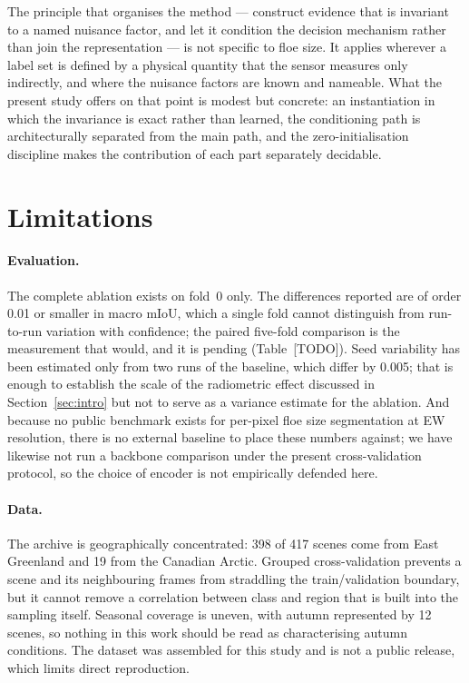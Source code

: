 \documentclass[preprint,12pt,authoryear]{elsarticle}
\begin{document}
The principle that organises the method --- construct evidence that is invariant
to a named nuisance factor, and let it condition the decision mechanism rather
than join the representation --- is not specific to floe size. It applies
wherever a label set is defined by a physical quantity that the sensor measures
only indirectly, and where the nuisance factors are known and nameable. What the
present study offers on that point is modest but concrete: an instantiation in
which the invariance is exact rather than learned, the conditioning path is
architecturally separated from the main path, and the zero-initialisation
discipline makes the contribution of each part separately decidable.

\section{Limitations}
\label{sec:limitations}

\paragraph{Evaluation.} The complete ablation exists on fold~0 only. The
differences reported are of order 0.01 or smaller in macro mIoU, which a single
fold cannot distinguish from run-to-run variation with confidence; the paired
five-fold comparison is the measurement that would, and it is pending
(Table~[TODO]). Seed variability has been estimated only from two runs of the
baseline, which differ by 0.005; that is enough to establish the scale of the
radiometric effect discussed in Section~\ref{sec:intro} but not to serve as a
variance estimate for the ablation. And because
no public benchmark exists for per-pixel floe size segmentation at EW
resolution, there is no external baseline to place these numbers against; we
have likewise not run a backbone comparison under the present cross-validation
protocol, so the choice of encoder is not empirically defended here.

\paragraph{Data.} The archive is geographically concentrated: 398 of 417 scenes
come from East Greenland and 19 from the Canadian Arctic. Grouped
cross-validation prevents a scene and its neighbouring frames from straddling
the train/validation boundary, but it cannot remove a correlation between class
and region that is built into the sampling itself.
Seasonal coverage is uneven, with autumn represented by 12 scenes, so nothing
in this work should be read as characterising autumn conditions. The dataset was
assembled for this study and is not a public release, which limits direct
reproduction.
\end{document}

